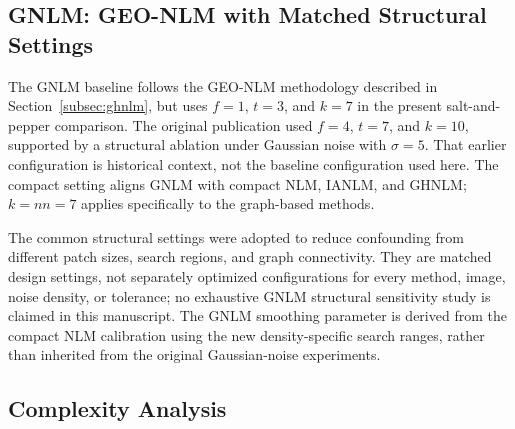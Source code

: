 \documentclass[pdflatex,iicol,sn-mathphys-num]{sn-jnl}
\newif\ifshowportuguese
\newcommand{\pt}[1]{\ifshowportuguese\par\begingroup\small\color{blue!55!black}\noindent\textbf{PT: }#1\par\endgroup\fi}
\begin{document}
\subsection{GNLM: GEO-NLM with Matched Structural Settings}
\label{subsec:geo_baseline}

The GNLM baseline follows the GEO-NLM methodology described in Section~\ref{subsec:ghnlm}, but uses $f=1$, $t=3$, and $k=7$ in the present salt-and-pepper comparison. The original publication used $f=4$, $t=7$, and $k=10$, supported by a structural ablation under Gaussian noise with $\sigma=5$. That earlier configuration is historical context, not the baseline configuration used here. The compact setting aligns GNLM with compact NLM, IANLM, and GHNLM; $k=nn=7$ applies specifically to the graph-based methods.
\pt{O baseline GNLM segue a metodologia do GEO-NLM descrita na Seção~\ref{subsec:ghnlm}, mas usa $f=1$, $t=3$ e $k=7$ na presente comparação com ruído sal-e-pimenta. A publicação original usou $f=4$, $t=7$ e $k=10$, fundamentados por uma ablação estrutural sob ruído Gaussiano com $\sigma=5$. Essa configuração anterior constitui contexto histórico, não a configuração do baseline usado aqui. A configuração compacta alinha o GNLM ao NLM compacto, IANLM e GHNLM; $k=nn=7$ aplica-se especificamente aos métodos baseados em grafos.}

The common structural settings were adopted to reduce confounding from different patch sizes, search regions, and graph connectivity. They are matched design settings, not separately optimized configurations for every method, image, noise density, or tolerance; no exhaustive GNLM structural sensitivity study is claimed in this manuscript. The GNLM smoothing parameter is derived from the compact NLM calibration using the new density-specific search ranges, rather than inherited from the original Gaussian-noise experiments.
\pt{As configurações estruturais comuns foram adotadas para reduzir fatores de confusão decorrentes de diferentes tamanhos de patch, regiões de busca e conectividade do grafo. Elas são escolhas de projeto compatibilizadas, e não configurações otimizadas separadamente para cada método, imagem, densidade de ruído ou tolerância; este manuscrito não reivindica um estudo exaustivo de sensibilidade estrutural do GNLM. O parâmetro de suavização do GNLM é derivado da calibração do NLM compacto com as novas faixas de busca específicas por densidade, e não herdado dos experimentos originais com ruído Gaussiano.}

\subsection{Complexity Analysis}
\label{subsec:complexity}
\end{document}

